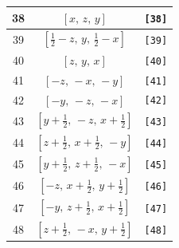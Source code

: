 \documentclass[fleqn,8pt]{jsarticle}
\begin{document}
\begin{longtable}{ccc}
38 & $\left[ x,\, z,\, y \right]$ & {\tt [38]} \\ \hline
39 & $\left[ \frac{1}{2} - z,\, y,\, \frac{1}{2} - x \right]$ & {\tt [39]} \\ \hline
40 & $\left[ z,\, y,\, x \right]$ & {\tt [40]} \\ \hline
41 & $\left[ - z,\, - x,\, - y \right]$ & {\tt [41]} \\ \hline
42 & $\left[ - y,\, - z,\, - x \right]$ & {\tt [42]} \\ \hline
43 & $\left[ y + \frac{1}{2},\, - z,\, x + \frac{1}{2} \right]$ & {\tt [43]} \\ \hline
44 & $\left[ z + \frac{1}{2},\, x + \frac{1}{2},\, - y \right]$ & {\tt [44]} \\ \hline
45 & $\left[ y + \frac{1}{2},\, z + \frac{1}{2},\, - x \right]$ & {\tt [45]} \\ \hline
46 & $\left[ - z,\, x + \frac{1}{2},\, y + \frac{1}{2} \right]$ & {\tt [46]} \\ \hline
47 & $\left[ - y,\, z + \frac{1}{2},\, x + \frac{1}{2} \right]$ & {\tt [47]} \\ \hline
48 & $\left[ z + \frac{1}{2},\, - x,\, y + \frac{1}{2} \right]$ & {\tt [48]} \\
\end{longtable}
\end{document}
